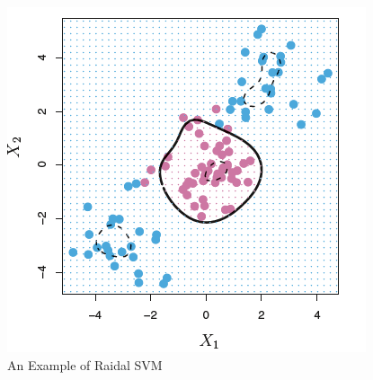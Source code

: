 \documentclass[11pt,a4paper,oneside]{article}
\begin{document}
\begin{figure}[t!]
    \centering
    \includegraphics[scale = 0.5]{Figures/figure3.png}
    \caption{An Example of Raidal SVM}
    \label{fig:figure3}
\end{figure}
\end{document}
